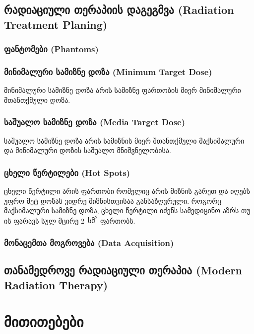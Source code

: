 \documentclass[12pt,a4paper,]{report}
\begin{document}
\section{რადიაციული თერაპიის დაგეგმვა (Radiation Treatment Planing)}
\subsection{ფანტომები (Phantoms)}

\subsection{მინიმალური სამიზნე დოზა (Minimum Target Dose)}
მინიმალური სამიზნე დოზა არის სამიზნე ფართობის მიერ მინიმალური შთანთქმული დოზა.

\subsection{საშუალო სამიზნე დოზა (Media Target Dose)}
საშუალო სამიზნე დოზა არის სამიზნის მიერ შთანთქმული მაქსიმალური და მინიმალური დოზის საშუალო მნიშვნელობისა.  

\subsection{ცხელი წერტილები (Hot Spots)}
ცხელი წერტილი არის ფართობი რომელიც არის მიზნის გარეთ და იღებს უფრო მეტ დოზას ვიდრე მიზნისთვისაა განსაზღვრული. როგორც მაქსიმალური სამიზნე დოზა, ცხელი წერტილი იძენს სამედიცინო აზრს თუ ის ფარავს სულ მცირე 2~$\text{სმ}^2$ ფართობს.

\subsection{მონაცემთა მოგროვება (Data Acquisition)}


\section{თანამედროვე რადიაციული თერაპია (Modern Radiation Therapy)}



\chapter{მითითებები}


\medskip

 
\end{document}
